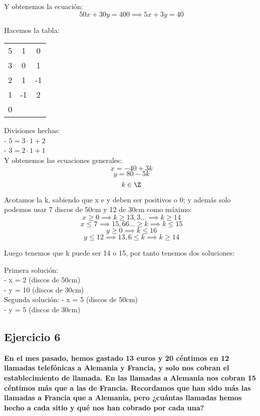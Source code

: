 \documentclass[11pt, a4paper, titlepage]{article}
\begin{document}
Y obtenemos la ecuación:
$$ 50x + 30y = 400 \implies 5x + 3y = 40 $$

Hacemos la tabla:

\begin{center}
\begin{tabular}{c|cc}
5 & 1 & 0 \\
3 & 0 & 1 \\
\hline
2 & 1 & -1 \\
\hline
1 & -1 & 2 \\
\hline
0
\end{tabular}
\end{center}

Divisiones hechas: \\
- $ 5 = 3 \cdot 1 + 2 $ \\
- $ 3 = 2 \cdot 1 + 1 $ \\

Y obtenemos las ecuaciones generales:
$$ x = -40 + 3k $$
$$ y = 80 - 5k $$ 
$$ k \in \Z $$

Acotamos la k, sabiendo que x e y deben ser positivos o 0; y además solo podemos usar 7 discos de 50cm y 12 de 30cm como máximo:
$$ x \geq 0 \implies k \geq 13,3... \implies k \geq 14 $$
$$ x \leq 7 \implies 15,66... \geq k \implies k \leq 15 $$
$$ y \geq 0 \implies k \leq 16 $$
$$ y \leq 12 \implies 13,6 \leq k \implies k \geq 14 $$

Luego tenemos que k puede ser 14 o 15, por tanto tenemos dos soluciones:

Primera solución: \\
- x = 2 (discos de 50cm) \\
- y = 10 (discos de 30cm) \\

Segunda solución:
- x = 5 (discos de 50cm) \\
- y = 5 (discos de 30cm) \\

\subsection{\LARGE{Ejercicio 6}}

\textbf{En el mes pasado, hemos gastado 13 euros y 20 céntimos en 12 llamadas
telefónicas a Alemania y Francia, y solo nos cobran el establecimiento de llamada.
En las llamadas a Alemania nos cobran 15 céntimos más que a las de Francia.
Recordamos que han sido más las llamadas a Francia que a Alemania, pero ¿cuántas
llamadas hemos hecho a cada sitio y qué nos han cobrado por cada una?}
\end{document}
